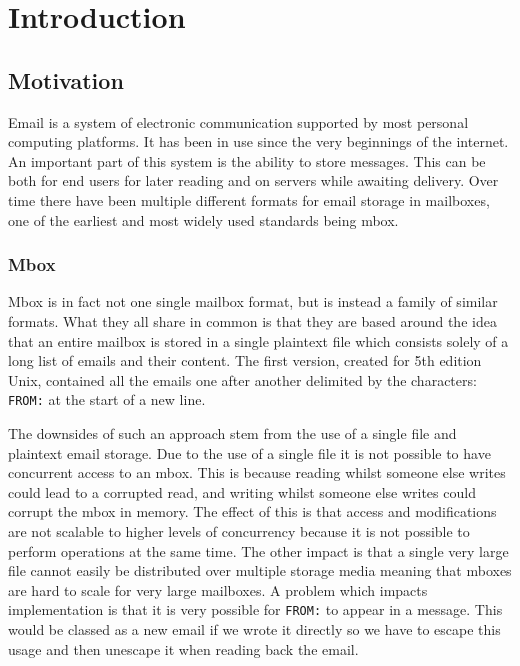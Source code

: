 \documentclass[12pt,a4paper,twoside,openright]{report}
\begin{document}
\pagestyle{headings}

\chapter{Introduction}

\section{Motivation}

Email is a system of electronic communication supported by most personal computing platforms. It has been in use since the very beginnings of the internet. An important part of this system is the ability to store messages. This can be both for end users for later reading and on servers while awaiting delivery. Over time there have been multiple different formats for email storage in mailboxes, one of the earliest and most widely used standards being mbox.

\subsection{Mbox}

Mbox is in fact not one single mailbox format, but is instead a family of similar formats. What they all share in common is that they are based around the idea that an entire mailbox is stored in a single plaintext file which consists solely of a long list of emails and their content. The first version, created for 5th edition Unix, contained all the emails one after another delimited by the characters: \texttt{FROM:} at the start of a new line.

The downsides of such an approach stem from the use of a single file and plaintext email storage. Due to the use of a single file it is not possible to have concurrent access to an mbox. This is because reading whilst someone else writes could lead to a corrupted read, and writing whilst someone else writes could corrupt the mbox in memory. The effect of this is that access and modifications are not scalable to higher levels of concurrency because it is not possible to perform operations at the same time. The other impact is that a single very large file cannot easily be distributed over multiple storage media meaning that mboxes are hard to scale for very large mailboxes. A problem which impacts implementation is that it is very possible for \texttt{FROM:} to appear in a message. This would be classed as a new email if we wrote it directly so we have to escape this usage and then unescape it when reading back the email.
\end{document}
